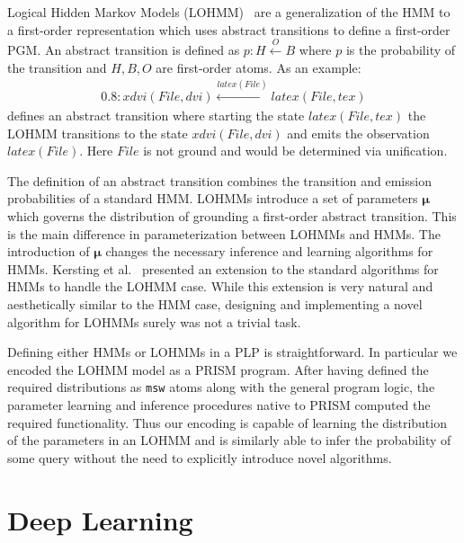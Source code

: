 \documentclass[11pt]{article}
\begin{document}
Logical Hidden Markov Models (LOHMM)~\cite{Kersting06logicalhidden} are a generalization of the HMM to a first-order representation which uses abstract transitions to define a first-order PGM.  An abstract transition is defined as $p: H \xleftarrow{O} B$ where $p$ is the probability of the transition and $H, B, O$ are first-order atoms.  
As an example:
\begin{gather*}
0.8 : xdvi(File, dvi) \xleftarrow{latex(File)} latex(File, tex)
\end{gather*}
defines an abstract transition where starting the state $latex(File, tex)$ the LOHMM transitions to the state $xdvi(File, dvi)$ and emits the observation $latex(File)$.  Here $File$ is not ground and would be determined via unification.

The definition of an abstract transition combines the transition and emission probabilities of a standard HMM.  LOHMMs introduce a set of parameters $\boldsymbol{\mu}$ which governs the distribution of grounding a first-order abstract transition.  This is the main difference in parameterization between LOHMMs and HMMs.  The introduction of $\boldsymbol{\mu}$ changes the necessary inference and learning algorithms for HMMs.  Kersting et al.~\cite{Kersting06logicalhidden} presented an extension to the standard algorithms for HMMs to handle the LOHMM case.  While this extension is very natural and aesthetically similar to the HMM case, designing and implementing a novel algorithm for LOHMMs surely was not a trivial task.

Defining either HMMs or LOHMMs in a PLP is straightforward.  In particular we encoded the LOHMM model as a PRISM program.  After having defined the required distributions as \verb!msw! atoms along with the general program logic, the parameter learning and inference procedures native to PRISM computed the required functionality.  Thus our encoding is capable of learning the distribution of the parameters in an LOHMM and is similarly able to infer the probability of some query without the need to explicitly introduce novel algorithms.

\section{Deep Learning}
\end{document}
